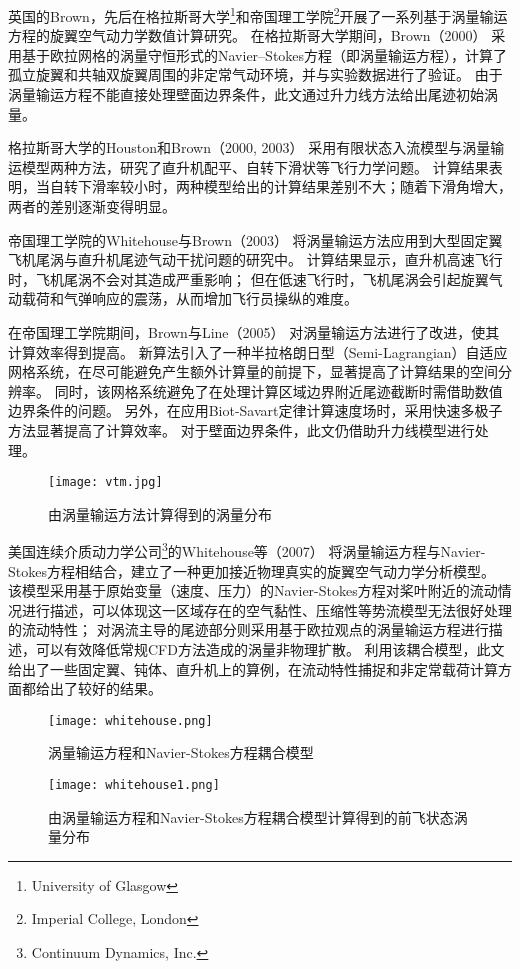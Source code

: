 英国的Brown，先后在格拉斯哥大学\footnote{University of Glasgow}和帝国理工学院\footnote{Imperial College, London}开展了一系列基于涡量输运方程的旋翼空气动力学数值计算研究。
在格拉斯哥大学期间，Brown（2000）
采用基于欧拉网格的涡量守恒形式的Navier–Stokes方程（即涡量输运方程），计算了孤立旋翼和共轴双旋翼周围的非定常气动环境，并与实验数据进行了验证。
由于涡量输运方程不能直接处理壁面边界条件，此文通过升力线方法给出尾迹初始涡量。

格拉斯哥大学的Houston和Brown（2000, 2003）
采用有限状态入流模型与涡量输运模型两种方法，研究了直升机配平、自转下滑状等飞行力学问题。
计算结果表明，当自转下滑率较小时，两种模型给出的计算结果差别不大；随着下滑角增大，两者的差别逐渐变得明显。

帝国理工学院的Whitehouse与Brown（2003）
将涡量输运方法应用到大型固定翼飞机尾涡与直升机尾迹气动干扰问题的研究中。
计算结果显示，直升机高速飞行时，飞机尾涡不会对其造成严重影响；
但在低速飞行时，飞机尾涡会引起旋翼气动载荷和气弹响应的震荡，从而增加飞行员操纵的难度。

在帝国理工学院期间，Brown与Line（2005）
对涡量输运方法进行了改进，使其计算效率得到提高。
新算法引入了一种半拉格朗日型（Semi-Lagrangian）自适应网格系统，在尽可能避免产生额外计算量的前提下，显著提高了计算结果的空间分辨率。
同时，该网格系统避免了在处理计算区域边界附近尾迹截断时需借助数值边界条件的问题。
另外，在应用Biot-Savart定律计算速度场时，采用快速多极子方法显著提高了计算效率。
对于壁面边界条件，此文仍借助升力线模型进行处理。
\begin{figure}[t!]
    \centering
    \texttt{[image: vtm.jpg]}
    \caption{由涡量输运方法计算得到的涡量分布}\label{vtm}
\end{figure}

美国连续介质动力学公司\footnote{Continuum Dynamics, Inc.}的Whitehouse等（2007）
将涡量输运方程与Navier-Stokes方程相结合，建立了一种更加接近物理真实的旋翼空气动力学分析模型。
该模型采用基于原始变量（速度、压力）的Navier-Stokes方程对桨叶附近的流动情况进行描述，可以体现这一区域存在的空气黏性、压缩性等势流模型无法很好处理的流动特性；
对涡流主导的尾迹部分则采用基于欧拉观点的涡量输运方程进行描述，可以有效降低常规CFD方法造成的涡量非物理扩散。
利用该耦合模型，此文给出了一些固定翼、钝体、直升机上的算例，在流动特性捕捉和非定常载荷计算方面都给出了较好的结果。
\begin{figure}[t!]
    \centering
    \texttt{[image: whitehouse.png]}
    \caption{涡量输运方程和Navier-Stokes方程耦合模型}
\end{figure}
\begin{figure}[t!]
    \centering
    \texttt{[image: whitehouse1.png]}
    \caption{由涡量输运方程和Navier-Stokes方程耦合模型计算得到的前飞状态涡量分布}
\end{figure}

